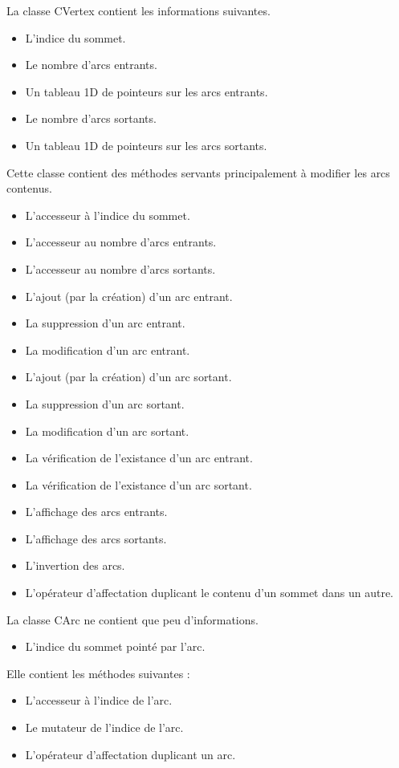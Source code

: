		La classe CVertex contient les informations suivantes.
		\begin{itemize}
			\item L'indice du sommet.
			\item Le nombre d'arcs entrants.
			\item Un tableau 1D de pointeurs sur les arcs entrants.
			\item Le nombre d'arcs sortants.
			\item Un tableau 1D de pointeurs sur les arcs sortants.\\
		\end{itemize}
		Cette classe contient des méthodes servants principalement à modifier les arcs contenus.
		\begin{itemize}
			\item L'accesseur à l'indice du sommet.
			\item L'accesseur au nombre d'arcs entrants.
			\item L'accesseur au nombre d'arcs sortants.
			\item L'ajout (par la création) d'un arc entrant.
			\item La suppression d'un arc entrant.
			\item La modification d'un arc entrant.
			\item L'ajout (par la création) d'un arc sortant.
			\item La suppression d'un arc sortant.
			\item La modification d'un arc sortant.
			\item La vérification de l'existance d'un arc entrant.
			\item La vérification de l'existance d'un arc sortant.
			\item L'affichage des arcs entrants.
			\item L'affichage des arcs sortants.
			\item L'invertion des arcs.
			\item L'opérateur d'affectation duplicant le contenu d'un sommet dans un autre.\\
		\end{itemize}
		
		La classe CArc ne contient que peu d'informations.
		\begin{itemize}
			\item L'indice du sommet pointé par l'arc.\\
		\end{itemize}
		Elle contient les méthodes suivantes :
		\begin{itemize}
			\item L'accesseur à l'indice de l'arc.
			\item Le mutateur de l'indice de l'arc.
			\item L'opérateur d'affectation duplicant un arc.\\
		\end{itemize}
		
